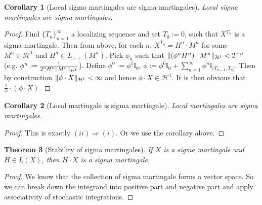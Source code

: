 \documentclass[openany,oneside]{book}
\newtheorem{thm}{Theorem}[section]
\newtheorem{cor}[thm]{Corollary}
\theoremstyle{definition}
\theoremstyle{remark}
\newcommand{\I}{\mathbb{I}} %
\DeclarePairedDelimiter{\norm}{\lVert}{\rVert} %
\begin{document}
\begin{cor}[Local sigma martingales are sigma martingales]
Local sigma martingales are sigma martingales.
\end{cor}
\begin{proof}
Find $\{T_n\}_{n=1}^\infty$ a localizing sequence and set $T_0 := 0$, such that $X^{T_n}$ is a sigma martingale. Then from above, for each $n$, $X^{T_n} = H^n \cdot M^n$ for some $M^n \in \mathcal{H}^1$ and $H^n \in L_{++}(M^n)$. Pick $\phi_n$ such that $\norm{(\phi^n H^n) \cdot M^n}_{\mathcal{H}^1} < 2^{-n}$ (e.g. $\phi^n := \frac{1}{2^n H^n \norm{M^n}_{\mathcal{H}^1}}$). Define $\phi^0 := \phi^1 \I_{0}$, $\phi := \phi^0 \I_{0} + \sum_{n=1}^\infty \phi^n \I_{(T_{n-1}, T_n]}$. Then by construction $\norm{\phi \cdot X}_{\mathcal{H}^1} < \infty$ and hence $\phi \cdot X \in \mathcal{H}^1$. It is then obvious that $\frac{1}{\phi} \cdot (\phi \cdot X)$.
\end{proof}

\begin{cor}[Local martingale is sigma martingale]
Local martingales are sigma martingales.
\end{cor}
\begin{proof}
This is exactly $(ii) \Rightarrow (i)$. Or we use the corollary above.
\end{proof}

\begin{thm}[Stability of sigma martingales]
If $X$ is a sigma martingale and $H\in L(X)$, then $H\cdot X$ is a sigma martingale.
\end{thm}
\begin{proof}
We know that the collection of sigma martingale forms a vector space. So we can break down the integrand into positive part and negative part and apply associativity of stochastic integrations.
\end{proof}
\end{document}
